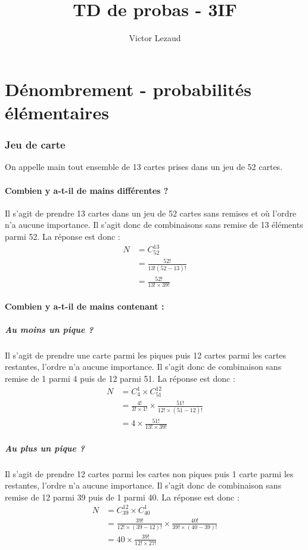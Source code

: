 \documentclass[10pt,a4paper,twoside]{article}
\author{Victor Lezaud}
\title{TD de probas - 3IF}
\begin{document}
\renewcommand{\partname}{Séance de Travaux Dirigés}

\maketitle
\renewcommand{\contentsname}{Sommaire}
\setcounter{tocdepth}{1}
\tableofcontents

\newpage
\part{Dénombrement - probabilités élémentaires}
\section{Jeu de carte}
On appelle main tout ensemble de 13 cartes prises dans un jeu de 52 cartes.
\subsection{Combien y a-t-il de mains différentes ?}
Il s'agit de prendre 13 cartes dans un jeu de 52 cartes sans remises et où l'ordre n'a aucune importance. Il s'agit donc de combinaisons sans remise de 13 éléments parmi 52. La réponse est donc :
\begin{align*}
N & =C_{52}^{13}\\
  & =\frac{52!}{13!(52-13)!}\\
  & =\frac{52!}{13!\times 39!}
\end{align*}

\subsection{Combien y a-t-il de mains contenant :}
\subsubsection{Au moins un pique ?}
Il s'agit de prendre une carte parmi les piques puis 12 cartes parmi les cartes restantes, l'ordre n'a aucune importance. Il s'agit donc de combinaison sans remise de 1 parmi 4 puis de 12 parmi 51. La réponse est donc :
\begin{align*}
N & = C^{1}_{4} \times C^{12}_{51}\\
  & = \frac{4!}{3! \times 1!} \times \frac{51!}{12! \times (51-12)!}\\
  & = 4\times\frac{51!}{13! \times 39!}
\end{align*}

\subsubsection{Au plus un pique ?}
Il s'agit de prendre 12 cartes parmi les cartes non piques puis 1 carte parmi les restantes, l'ordre n'a aucune importance. Il s'agit donc de combinaison sans remise de 12 parmi 39 puis de 1 parmi 40. La réponse est donc :
\begin{align*}
N & = C^{12}_{39} \times C^{1}_{40}\\
  & = \frac{39!}{12!\times (39-12)!} \times \frac{40!}{39!\times (40-39)!}\\
  & = 40 \times \frac{39!}{12!\times 27!}
\end{align*}
\end{document}
